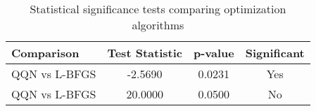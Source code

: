 \begin{table}[htbp]
\centering
\caption{Statistical significance tests comparing optimization algorithms}
\label{tab:significance}
\begin{tabular}{lccc}
\toprule
Comparison & Test Statistic & p-value & Significant \\
\midrule
QQN vs L-BFGS & -2.5690 & 0.0231 & Yes \\
QQN vs L-BFGS & 20.0000 & 0.0500 & No \\
\bottomrule
\end{tabular}
\end{table}
